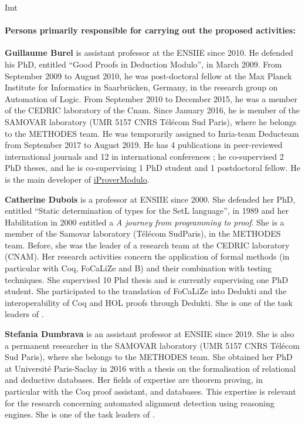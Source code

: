 \begin{sitedescription}{Imt}
\paragraph*{Persons primarily responsible for carrying out the proposed activities:}

\begin{compactitem} %

\item{\bf Guillaume Burel}
 is
assistant professor at the ENSIIE since 2010. He defended his PhD,
entitled ``Good Proofs in Deduction Modulo'', in March 2009. From
September 2009 to August 2010, he was post-doctoral fellow at the Max
Planck Institute for Informatics in Saarbr\"ucken, Germany, in the
research group on Automation of Logic. From September 2010 to December
2015, he was a member of the CEDRIC laboratory of the Cnam. Since
January 2016, he is member of the SAMOVAR laboratory (UMR 5157 CNRS
T\'el\'ecom Sud Paris), where he belongs to the METHODES team. He was
temporarily assigned to Inria-team Deducteam from September 2017 to
August 2019.  He has 4
publications in peer-reviewed international journals and 12 in
international conferences ; he co-supervised 2 PhD theses, and he is
co-supervising 1 PhD student and 1 postdoctoral fellow. He is the
main developer of
\href{http://www.ensiie.fr/~guillaume.burel/blackandwhite_iProverModulo.html.en}{iProverModulo}.

\item {\bf Catherine Dubois} is a professor at ENSIIE since 2000. She defended her PhD, entitled ``Static determination of types for the SetL language'', in 1989 and her Habilitation in 2000 entitled a
\emph{A journey from programming to proof}. She is a
member of the Samovar laboratory (T\'el\'ecom
SudParis), in the METHODES team. Before, she was the leader of a research team at the CEDRIC laboratory (CNAM). Her research activities concern the application of formal methods (in particular with Coq, FoCaLiZe and B) and their combination with testing techniques. She supervised 10 Phd thesis and is currently supervising one PhD student. She participated to the translation of FoCaLiZe into Dedukti and the interoperability of Coq and HOL proofs through Dedukti.
She is one of the task leaders of .

\item{\bf Stefania Dumbrava}
is an assistant professor at ENSIIE since 2019. She is also a permanent researcher in the SAMOVAR laboratory (UMR 5157 CNRS T\'el\'ecom
Sud Paris), where she belongs to the METHODES team. She obtained her PhD at Universit\'e Paris-Saclay in 2016 with a thesis on the formalisation
of relational and deductive databases. Her fields of expertise are theorem proving, in particular with the Coq proof assistant, and databases.
This expertise is relevant for the research concerning automated alignment detection using reasoning engines. She is one of the task leaders of .
\end{compactitem}


\end{sitedescription}
